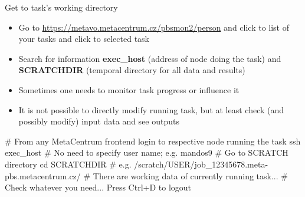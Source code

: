 \documentclass[compress, xelatex, 11pt, xcolor=svgnames, aspectratio=169, url={hyphens, lowtilde}]{beamer}
\begin{document}
\begin{frame}[fragile]{Get to task's working directory}
	\begin{itemize}
		\item Go to \url{https://metavo.metacentrum.cz/pbsmon2/person} and click to list of your tasks and click to selected task
		\item Search for information \textbf{exec\_host} (address of node doing the task) and \textbf{SCRATCHDIR} (temporal directory for all data and results)
		\item Sometimes one needs to monitor task progress or influence it
		\item It is not possible to directly modify running task, but at least check (and possibly modify) input data and see outputs
	\end{itemize}
	\begin{bashcode}
    # From any MetaCentrum frontend login to respective node running the task
    ssh exec_host # No need to specify user name; e.g. mandos9
    # Go to SCRATCH directory
    cd SCRATCHDIR # e.g. /scratch/USER/job_12345678.meta-pbs.metacentrum.cz/
    # There are working data of currently running task...
    # Check whatever you need... Press Ctrl+D to logout
	\end{bashcode}
\end{frame}

%
\end{document}
